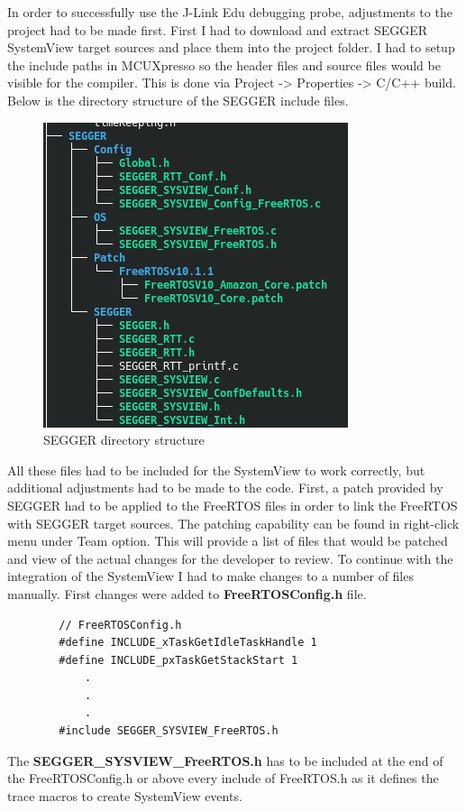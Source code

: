 \documentclass[12pt,a4paper]{article}
\begin{document}
		In order to successfully use the J-Link Edu debugging probe, adjustments to the project had to be made first.
		First I had to download and extract SEGGER SystemView target sources and place them into the project folder. I had to setup the include paths in MCUXpresso so the header files and source files would be visible for the compiler. This is done via Project -> Properties -> C/C++ build. Below is the directory structure of the SEGGER include files.
		\begin{figure}[h]
            \centering
            \includegraphics[scale=1]{SEGGER_directory_structure}
            \caption{SEGGER directory structure}
		\end{figure}
		All these files had to be included for the SystemView to work correctly, but additional adjustments had to be made to the code. First, a patch provided by SEGGER had to be applied to the FreeRTOS files in order to link the FreeRTOS with SEGGER target sources. The patching capability can be found in right-click menu under Team option. This will provide a list of files that would be patched and view of the actual changes for the developer to review.
		To continue with the integration of the SystemView I had to make changes to a number of files manually. First changes were added to {\bfseries FreeRTOSConfig.h} file.
		\begin{lstlisting}
        // FreeRTOSConfig.h
        #define INCLUDE_xTaskGetIdleTaskHandle 1
        #define INCLUDE_pxTaskGetStackStart 1
            .
            .
            .
        #include SEGGER_SYSVIEW_FreeRTOS.h
		\end{lstlisting}
		The {\bfseries SEGGER\_SYSVIEW\_FreeRTOS.h} has to be included at the end of the FreeRTOSConfig.h or above every include of FreeRTOS.h as it defines the trace macros to create SystemView events.\\
\end{document}
